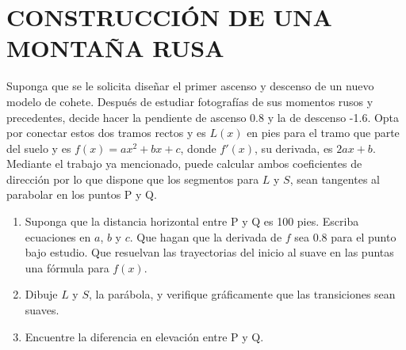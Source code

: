 \chapter*{CONSTRUCCIÓN DE UNA MONTAÑA RUSA}

Suponga que se le solicita diseñar el primer ascenso y descenso de un nuevo modelo de cohete. Después de estudiar fotografías de sus momentos rusos y precedentes, decide hacer la pendiente de ascenso 0.8 y la de descenso -1.6. Opta por conectar estos dos tramos rectos y es \( L(x) \) en pies para el tramo que parte del suelo y es \( f(x)= ax^2 + bx + c \), donde \( f'(x) \), su derivada, es \( 2ax + b \). Mediante el trabajo ya mencionado, puede calcular ambos coeficientes de dirección por lo que dispone que los segmentos para \( L \) y \( S \), sean tangentes al parabolar en los puntos P y Q.

\begin{enumerate}[label=\alph*)]
    \item Suponga que la distancia horizontal entre P y Q es 100 pies. Escriba ecuaciones en \( a \), \( b \) y \( c \).
    Que hagan que la derivada de \( f \) sea 0.8 para el punto bajo estudio.
    Que resuelvan las trayectorias del inicio al suave en las puntas una fórmula para \( f(x) \).
    \item Dibuje \( L \) y \( S \), la parábola, y verifique gráficamente que las transiciones sean suaves.
    \item Encuentre la diferencia en elevación entre P y Q.
\end{enumerate}
    